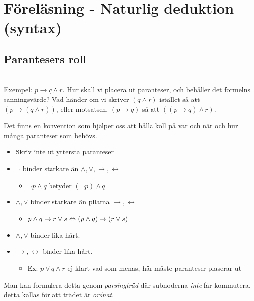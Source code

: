 \section{Föreläsning - Naturlig deduktion (syntax)}

\subsection{Parantesers roll}\hfill\\

\noindent Exempel: $p\rightarrow q\wedge r$. Hur skall vi placera ut paranteser, och behåller det formelns sanningsvärde? Vad händer om vi skriver $(q\wedge r)$ istället så att $(p\rightarrow(q\wedge r))$, eller motsatsen, $(p\rightarrow q)$ så att $((p\rightarrow q)\wedge r)$.
\par\bigskip

\noindent Det finns en konvention som hjälper oss att hålla koll på var och när och hur många paranteser som behövs.

\begin{itemize}
  \item Skriv inte ut yttersta paranteser
  \item $\neg$ binder starkare än $\wedge,\vee,\rightarrow,\leftrightarrow$
    \begin{itemize}
      \item $\neg p \wedge q$ betyder $(\neg p)\wedge q$
    \end{itemize}
  \item $\wedge, \vee$ binder starkare än pilarna $\rightarrow, \leftrightarrow$
    \begin{itemize}
      \item $p\wedge q \rightarrow r\vee s \Leftrightarrow (p\wedge q)\rightarrow (r\vee s)$
    \end{itemize}
  \item $\wedge, \vee$ binder lika hårt.
  \item $\rightarrow, \leftrightarrow$ binder lika hårt. 
    \begin{itemize}
      \item Ex: $p\vee q\wedge r$ ej klart vad som menas, här måste paranteser plaserar ut
    \end{itemize}
\end{itemize}
\par\bigskip

\noindent Man kan formulera detta genom \textit{parsingträd} där subnoderna \textit{inte} får kommutera, detta kallas för att trädet är \textit{ordnat}.
\par\bigskip

